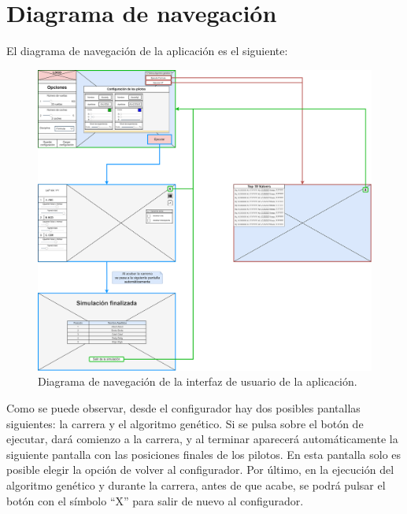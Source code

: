 \section{Diagrama de navegación}



El diagrama de navegación de la aplicación es el siguiente:

\begin{figure}[H]
    \centering
    \includegraphics[width=\textwidth]{imagenes/nav.png}
    \caption{Diagrama de navegación de la interfaz de usuario de la aplicación.}
\end{figure}

Como se puede observar, desde el configurador hay dos posibles pantallas siguientes: la carrera y el algoritmo genético. Si se pulsa sobre el botón de ejecutar, dará comienzo a la carrera, y al terminar aparecerá automáticamente la siguiente pantalla con las posiciones finales de los pilotos. En esta pantalla solo es posible elegir la opción de volver al configurador. Por último, en la ejecución del algoritmo genético y durante la carrera, antes de que acabe, se podrá pulsar el botón con el símbolo ``X'' para salir de nuevo al configurador.

